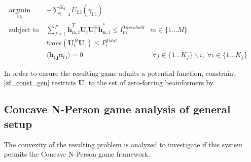 \documentclass[12pt,a4paper]{report}
\begin{document}
	\begin{subequations}
	\label{optim}
	\begin{align}
	    \underset{\mathbf{U}_{\mathrm{f}} }{\text{argmin}} \;
	    & - \sum_{\mathrm{i=1}}^{\mathrm{K_f}}
    	U_{\mathrm{f,i}}(\gamma_{\mathrm{f,i}}) \label{player_opt} \\
	    \text{subject to} \; &
	   \sum^F_{f=1} \mathbf{\tilde{h}}_{\mathrm{m,f}}^T  \mathbf{U_{\mathrm{f}}}		
	\mathbf{U_{\mathrm{f}}^{\mathrm{H}}} \mathbf{\tilde{h}_{\mathrm{m,f}}^*} \leq I^{Threshold}		
	_{\mathrm{m}} & m \in \{1 ...M\} 
		\label{interference_const_gen}\\
        & trace(\mathbf{U}_{\text{f}}^H\mathbf{U}_{\text{f}}) \leq P^{Total}_{\text{f}} \label{power_const_gen}\\
        & \langle \mathbf{h_{\text{f,j}}}\mathbf{u_{\text{f,i}}} \rangle =0\ & \; \forall j \in \{1... K_f\}\backslash i ,\; \forall i \in \{1 ... K_f\} \label{zf_const_gen}
	\end{align}
	\end{subequations}
	
In order to ensure the resulting game admits a potential function, constraint \eqref{zf_const_gen} restricts $\mathbf{U}_{\mathrm{f}}$ to the set of zero-forcing beamformers by.	
	
\subsection{Concave N-Person game analysis of general setup}
The convexity of the resulting problem is analyzed to investigate if this system permits the Concave N-Person game framework. 
\end{document}
